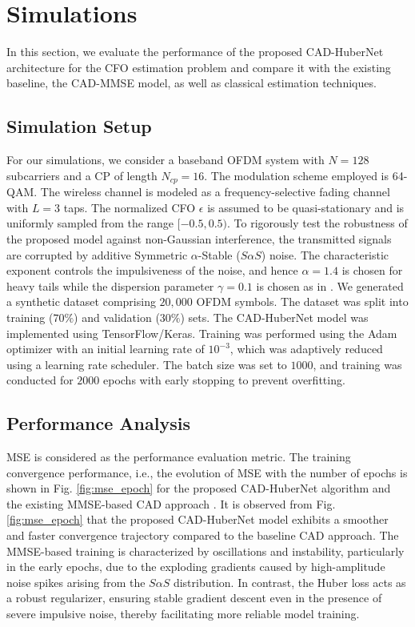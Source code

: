 \documentclass[10pt, journal]{IEEEtran}
\begin{document}
\section{Simulations}

In this section, we evaluate the performance of the proposed CAD-HuberNet architecture for the CFO estimation problem and compare it with the existing baseline, the CAD-MMSE model, as well as classical estimation techniques.

\subsection{Simulation Setup}
For our simulations, we consider a baseband OFDM system with $N=128$ subcarriers and a CP of length $N_{cp}=16$. The modulation scheme employed is 64-QAM. The wireless channel is modeled as a frequency-selective fading channel with $L=3$ taps. The normalized CFO $\epsilon$ is assumed to be quasi-stationary and is uniformly sampled from the range $[-0.5, 0.5)$. To rigorously test the robustness of the proposed model against non-Gaussian interference, the transmitted signals are corrupted by additive Symmetric $\alpha$-Stable ($S\alpha S$) noise. The characteristic exponent controls the impulsiveness of the noise, and hence $\alpha = 1.4$ is chosen for heavy tails while the dispersion parameter $\gamma = 0.1$ is chosen as in \cite{9794606}. We generated a synthetic dataset comprising $20,000$ OFDM symbols. The dataset was split into training ($70\%$) and validation ($30\%$) sets. The CAD-HuberNet model was implemented using TensorFlow/Keras. Training was performed using the Adam optimizer with an initial learning rate of $10^{-3}$, which was adaptively reduced using a learning rate scheduler. The batch size was set to $1000$, and training was conducted for $2000$ epochs with early stopping to prevent overfitting. 

\subsection{Performance Analysis}
MSE is considered as the performance evaluation metric. The training convergence performance, i.e., the evolution of MSE with the number of epochs is shown in Fig. \ref{fig:mse_epoch} for the proposed CAD-HuberNet algorithm and the existing MMSE-based CAD approach \cite{chaudhari2023_cad}. It is observed from Fig. \ref{fig:mse_epoch} that the proposed CAD-HuberNet model exhibits a smoother and faster convergence trajectory compared to the baseline CAD approach. The MMSE-based training is characterized by oscillations and instability, particularly in the early epochs, due to the exploding gradients caused by high-amplitude noise spikes arising from the $S\alpha S$ distribution. In contrast, the Huber loss acts as a robust regularizer, ensuring stable gradient descent even in the presence of severe impulsive noise, thereby facilitating more reliable model training.
\end{document}
